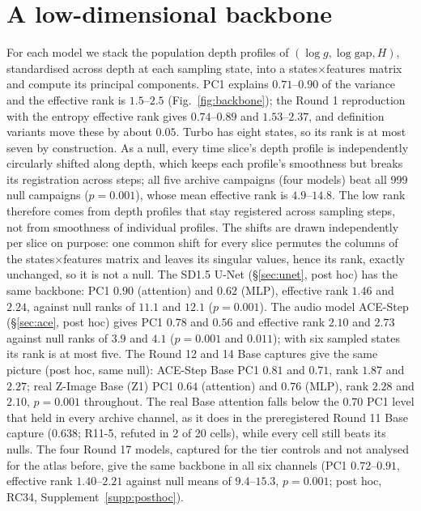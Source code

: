 \documentclass[11pt]{article}
\newcommand{\gap}{\mathrm{gap}}
\begin{document}
\section{A low-dimensional backbone}\label{sec:backbone}

For each model we stack the population depth profiles of $(\log g,\log\gap,H)$, standardised across depth at each sampling state, into a states$\times$features matrix and compute its principal components. PC1 explains $0.71$--$0.90$ of the variance and the effective rank is $1.5$--$2.5$ (Fig.~\ref{fig:backbone}); the Round 1 reproduction with the entropy effective rank gives $0.74$--$0.89$ and $1.53$--$2.37$, and definition variants move these by about $0.05$. Turbo has eight states, so its rank is at most seven by construction. As a null, every time slice's depth profile is independently circularly shifted along depth, which keeps each profile's smoothness but breaks its registration across steps; all five archive campaigns (four models) beat all 999 null campaigns ($p=0.001$), whose mean effective rank is $4.9$--$14.8$. The low rank therefore comes from depth profiles that stay registered across sampling steps, not from smoothness of individual profiles. The shifts are drawn independently per slice on purpose: one common shift for every slice permutes the columns of the states$\times$features matrix and leaves its singular values, hence its rank, exactly unchanged, so it is not a null. The SD1.5 U-Net (\S\ref{sec:unet}, post hoc) has the same backbone: PC1 $0.90$ (attention) and $0.62$ (MLP), effective rank $1.46$ and $2.24$, against null ranks of $11.1$ and $12.1$ ($p=0.001$). The audio model ACE-Step (\S\ref{sec:ace}, post hoc) gives PC1 $0.78$ and $0.56$ and effective rank $2.10$ and $2.73$ against null ranks of $3.9$ and $4.1$ ($p=0.001$ and $0.011$); with six sampled states its rank is at most five. The Round 12 and 14 Base captures give the same picture (post hoc, same null): ACE-Step Base PC1 $0.81$ and $0.71$, rank $1.87$ and $2.27$; real Z-Image Base (Z1) PC1 $0.64$ (attention) and $0.76$ (MLP), rank $2.28$ and $2.10$, $p=0.001$ throughout. The real Base attention falls below the $0.70$ PC1 level that held in every archive channel, as it does in the preregistered Round 11 Base capture ($0.638$; R11-5, refuted in 2 of 20 cells), while every cell still beats its nulls. The four Round 17 models, captured for the tier controls and not analysed for the atlas before, give the same backbone in all six channels (PC1 $0.72$--$0.91$, effective rank $1.40$--$2.21$ against null means of $9.4$--$15.3$, $p=0.001$; post hoc, RC34, Supplement~\ref{supp:posthoc}).
\end{document}

